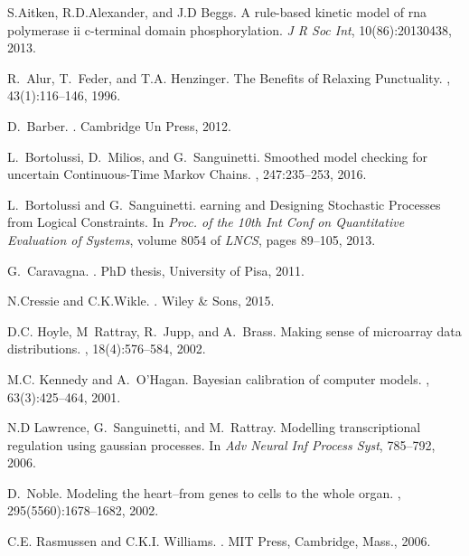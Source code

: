 \documentclass[runningheads,a4paper]{llncs}
\begin{document}
{\small
%	
       
\begin{thebibliography}{10}

\small
S.Aitken, R.D.Alexander, and J.D Beggs.
\newblock A rule-based kinetic model of rna polymerase ii c-terminal domain
  phosphorylation. {\em J R Soc Int}, 10(86):20130438, 2013.

R.~Alur, T.~Feder, and T.A. Henzinger.
\newblock The {Benefits} of {Relaxing} {Punctuality}.
, 43(1):116--146, 1996.

D.~Barber.
.
\newblock Cambridge Un Press, 2012.

L.~Bortolussi, D.~Milios, and G.~Sanguinetti.
\newblock Smoothed model checking for uncertain {Continuous}-{Time} {Markov}
  {Chains}.
, 247:235--253, 2016.

L.~Bortolussi and G.~Sanguinetti.
earning and {D}esigning {S}tochastic {P}rocesses from {L}ogical
  {C}onstraints.
\newblock In {\em Proc. of the 10th Int Conf on Quantitative Evaluation of
  Systems}, volume 8054 of {\em LNCS}, pages 89--105, 2013.

G.~Caravagna.
.
\newblock PhD thesis, University of Pisa, 2011.

\small
N.Cressie and C.K.Wikle.
.
\newblock Wiley \& Sons, 2015.

D.C. Hoyle, M~Rattray, R.~Jupp, and A.~Brass.
\newblock Making sense of microarray data distributions.
, 18(4):576--584, 2002.

M.C. Kennedy and A.~O'Hagan.
\newblock Bayesian calibration of computer models.
,
  63(3):425--464, 2001.


\small
N.D Lawrence, G.~Sanguinetti, and M.~Rattray.
\newblock Modelling transcriptional regulation using gaussian processes.
\newblock In {\em Adv Neural Inf Process Syst}, 785--792, 2006.

D.~Noble.
\newblock Modeling the heart--from genes to cells to the whole organ.
, 295(5560):1678--1682, 2002.

C.E. Rasmussen and C.K.I. Williams.
.
\newblock MIT Press, Cambridge, Mass., 2006.

\end{thebibliography}
}
\end{document}
